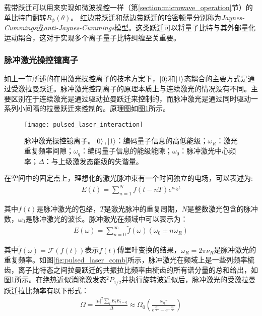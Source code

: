 载带跃迁可以用来实现如微波操控一样（第\ref{section:microwave_operation}节）的单比特门翻转$R_\phi(\theta)$。
红边带跃迁和蓝边带跃迁的哈密顿量分别称为\emph{Jaynes-Cummings}或\emph{anti-Jaynes-Cummings}模型\cite[]{Karnieli_Fan_2023}。这类跃迁可以将量子比特与其外部量化运动耦合，这对于实现多个离子量子比特纠缠至关重要。
\subsubsection[脉冲激光操控镱离子]{脉冲激光操控镱离子\label{section:pulsed_laser_ion_operation}}
如上一节所述的在用激光操控离子的技术方案下，$\ket{0}$和$\ket{1}$态耦合的主要方式是通过受激拉曼跃迁。脉冲激光控制离子的原理本质上与连续激光的情况没有不同。主要区别在于连续激光是通过驱动拉曼跃迁来控制的，而脉冲激光是通过同时驱动一系列小间隔的拉曼跃迁来控制的。原理图如图\ref{fig:pulsed_laser_interaction}所示。
\begin{figure}
    \centering
    \caption[脉冲激光操控镱离子]{脉冲激光操控镱离子。$\ket{0},\ket{1}$：编码量子信息的高低能级；$\omega_R$：激光重复频率间隙；$\omega_q$：编码量子信息的能级能隙；$\omega_0$：脉冲激光中心频率；$\Delta$：与上级激发态能级的失谐量。\label{fig:pulsed_laser_interaction}}
    \texttt{[image: pulsed\_laser\_interaction]}
\end{figure}

在空间中的固定点上，理想化的激光脉冲束有一个时间独立的电场，可以表述为:
\begin{align}
    E(t)=\sum_{n=1}^{N}f(t-nT)e^{i\omega_0t}
\end{align}

其中$f(t)$是脉冲激光的包络，$T$是激光脉冲的重复周期，$N
$是整数激光包含的脉冲数，$\omega_0$是脉冲激光的波长。脉冲激光在频域中可以表示为：
\begin{align}
    E(\omega)=\sum_{n=0}^{\infty}\tilde{f}(\omega)(\omega_0\pm n\omega_R)
\end{align}

其中$\tilde{f}(\omega)=\mathcal{F}(f(t))$表示$f(t)$傅里叶变换的结果，$\omega_R=2\pi\nu_R$是脉冲激光的重复频率。如图\ref{fig:pulsed_laser_comb}所示，脉冲激光在频域上是一些列频率梳齿，离子比特态之间拉曼跃迁的共振拉比频率由梳齿的所有谱分量的总和给出，如图\ref{fig:pulsed_laser_interaction}所示。在绝热近似消除激发态$^2P_{1/2}$并执行旋转波近似后，脉冲激光的受激拉曼跃迁拉比频率有以下形式\cite[]{Hayes_Matsukevich_Maunz_Hucul_Quraishi_Olmschenk_Campbell_Mizrahi_Senko_Monroe_2010}：
\begin{align}
    \Omega=\frac{|\mu|^2\sum_{l}^{}E_lE_{l-q}}{\Delta}\approx\Omega_0\left(\frac{\omega_q\tau}{e^{\frac{\omega_q\tau}{2}}-e^{-\frac{\omega_q\tau}{2}}}\right)
\end{align}

